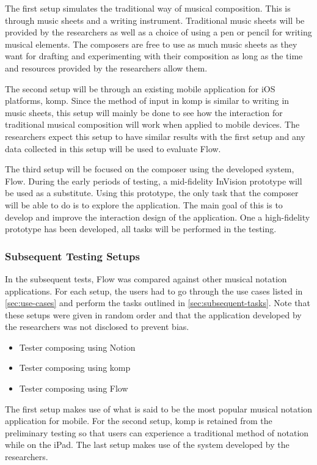 				The first setup simulates the traditional way of musical composition. This is through music sheets and a writing instrument. Traditional music sheets will be provided by the researchers as well as a choice of using a pen or pencil for writing musical elements. The composers are free to use as much music sheets as they want for drafting and experimenting with their composition as long as the time and resources provided by the researchers allow them.

				The second setup will be through an existing mobile application for iOS platforms, komp. Since the method of input in komp is similar to writing in music sheets, this setup will mainly be done to see how the interaction for traditional musical composition will work when applied to mobile devices. The researchers expect this setup to have similar results with the first setup and any data collected in this setup will be used to evaluate Flow.

				The third setup will be focused on the composer using the developed system, Flow. During the early periods of testing, a mid-fidelity InVision prototype will be used as a substitute. Using this prototype, the only task that the composer will be able to do is to explore the application. The main goal of this is to develop and improve the interaction design of the application. One a high-fidelity prototype has been developed, all tasks will be performed in the testing.

			\subsubsection{Subsequent Testing Setups}

				In the subsequent tests, Flow was compared against other musical notation applications. For each setup, the users had to go through the use cases listed in \ref{sec:use-cases} and perform the tasks outlined in \ref{sec:subsequent-tasks}. Note that these setups were given in random order and that the application developed by the researchers was not disclosed to prevent bias.

				\begin{itemize}
					\item Tester composing using Notion
					\item Tester composing using komp
					\item Tester composing using Flow
				\end{itemize}

				The first setup makes use of what is said to be the most popular musical notation application for mobile. For the second setup, komp is retained from the preliminary testing so that users can experience a traditional method of notation while on the iPad. The last setup makes use of the system developed by the researchers.

